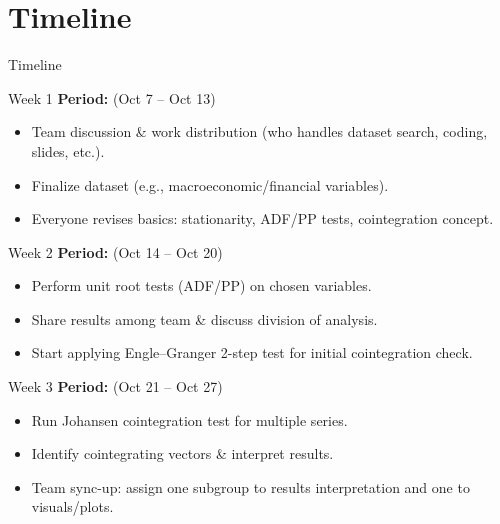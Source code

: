 \section{Timeline}

\begin{frame}{Timeline}
	\begin{center}
	\end{center}
\end{frame}

\begin{frame}{Week 1}
	\textbf{Period: }(Oct 7 – Oct 13)
	\begin{itemize}
		\item Team discussion \& work distribution (who handles dataset search, coding, slides, etc.).
		\item Finalize dataset (e.g., macroeconomic/financial variables).
		\item Everyone revises basics: stationarity, ADF/PP tests, cointegration concept.
	\end{itemize}
\end{frame}

\begin{frame}{Week 2}
	\textbf{Period: }(Oct 14 – Oct 20)
	\begin{itemize}
		\item Perform unit root tests (ADF/PP) on chosen variables.
		\item Share results among team \& discuss division of analysis.
		\item Start applying Engle–Granger 2-step test for initial cointegration check.
	\end{itemize}
\end{frame}

\begin{frame}{Week 3}
	\textbf{Period: }(Oct 21 – Oct 27)
	\begin{itemize}
		\item Run Johansen cointegration test for multiple series.
		\item Identify cointegrating vectors \& interpret results.
		\item Team sync-up: assign one subgroup to results interpretation and one to visuals/plots.
	\end{itemize}
\end{frame}

